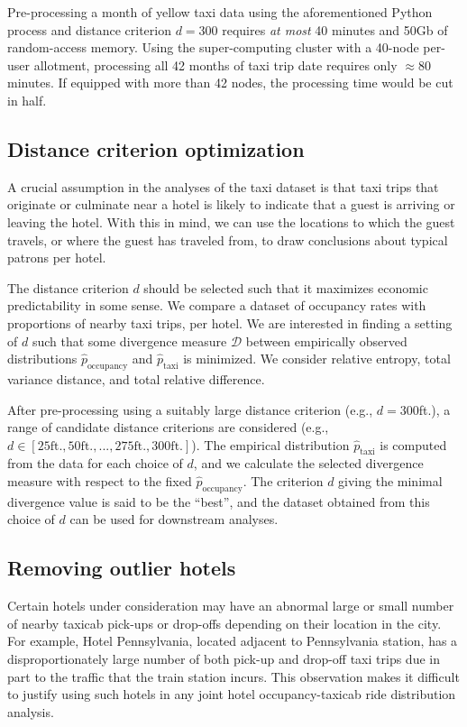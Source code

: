 \documentclass[useAMS, referee, usenatbib]{biom}
\begin{document}
Pre-processing a month of yellow taxi data using the aforementioned Python process and distance criterion $d = 300$ requires \textit{at most} 40 minutes and 50Gb of random-access memory. Using the super-computing cluster with a 40-node per-user allotment, processing all 42 months of taxi trip date requires only $\approx$80 minutes. If equipped with more than 42 nodes, the processing time would be cut in half.

\subsection{Distance criterion optimization}

A crucial assumption in the analyses of the taxi dataset is that taxi trips that originate or culminate near a hotel is likely to indicate that a guest is arriving or leaving the hotel. With this in mind, we can use the locations to which the guest travels, or where the guest has traveled from, to draw conclusions about typical patrons per hotel.

The distance criterion $d$ should be selected such that it maximizes economic predictability in some sense. We compare a dataset of occupancy rates with proportions of nearby taxi trips, per hotel. We are interested in finding a setting of $d$ such that some divergence measure $\mathcal{D}$ between empirically observed distributions $\hat{p}_{\mathrm{occupancy}}$ and $\hat{p}_{\mathrm{taxi}}$ is minimized. We consider relative entropy, total variance distance, and total relative difference.

After pre-processing using a suitably large distance criterion (e.g., $d = 300$ft.), a range of candidate distance criterions are considered (e.g., $d \in [25 \mathrm{ft.}, 50 \mathrm{ft.}, ..., 275 \mathrm{ft.}, 300 \mathrm{ft.}]$). The empirical distribution $\hat{p}_{\mathrm{taxi}}$ is computed from the data for each choice of $d$, and we calculate the selected divergence measure with respect to the fixed $\hat{p}_{\mathrm{occupancy}}$. The criterion $d$ giving the minimal divergence value is said to be the ``best'', and the dataset obtained from this choice of $d$ can be used for downstream analyses.

\subsection{Removing outlier hotels}

Certain hotels under consideration may have an abnormal large or small number of nearby taxicab pick-ups or drop-offs depending on their location in the city. For example, Hotel Pennsylvania, located adjacent to Pennsylvania station, has a disproportionately large number of both pick-up and drop-off taxi trips due in part to the traffic that the train station incurs. This observation makes it difficult to justify using such hotels in any joint hotel occupancy-taxicab ride distribution analysis.
\end{document}
